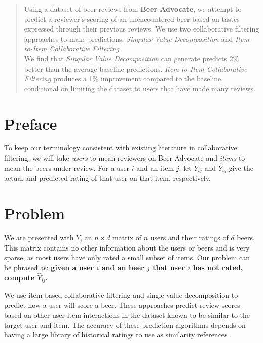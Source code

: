 \documentclass[12pt]{article}
\begin{document}
\maketitle
\begin{abstract}
Using a dataset of beer reviews from \textbf{Beer Advocate}, we attempt to predict a reviewer's scoring of an unencountered beer based on tastes expressed through their previous reviews. We use two collaborative filtering approaches to make predictions: \textit{Singular Value Decomposition} and \textit{Item-to-Item Collaborative Filtering}. \\

We find that \textit{Singular Value Decomposition} can generate predicts 2\% better than the average baseline predictions. \textit{Item-to-Item Collaborative Filtering} produces a 1\% improvement compared to the baseline, conditional on limiting the dataset to users that have made many reviews. \\
\end{abstract}



\section{Preface}
To keep our terminology consistent with existing literature in collaborative filtering, we will take \textit{users} to mean reviewers on Beer Advocate and \textit{items} to mean the beers under review. For a user $i$ and an item $j$, let $Y_{ij}$ and $\hat Y_{ij}$ give the actual and predicted rating of that user on that item, respectively.

\section{Problem}
We are presented with $Y$, an $n \times d$ matrix of $n$ users and their ratings of $d$ beers. This matrix contains no other information about the users or beers and is very sparse, as most users have only rated a small subset of items. Our problem can be phrased as: \textbf{given a user $i$ and an beer $j$ that user $i$ has not rated, compute $\hat Y_{ij}$}.

We use item-based collaborative filtering and single value decomposition to predict how a user will score a beer. These approaches predict review scores based on other user-item interactions in the dataset known to be similar to the target user and item. The accuracy of these prediction algorithms depends on having a large library of historical ratings to use as similarity references {\cite{sarwar}}.
\end{document}

